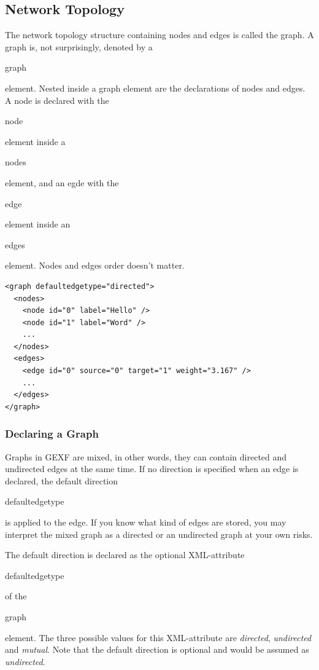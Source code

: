 \documentclass[a4paper,10pt]{article}
\begin{document}
\subsection{Network Topology} \label{networktopology}

The network topology structure containing nodes and edges is called the graph. A graph is, not surprisingly, denoted by a \begin{footnotesize}graph\end{footnotesize} element. Nested inside a graph element are the declarations of nodes and edges. A node is declared with the \begin{footnotesize}node\end{footnotesize} element inside a \begin{footnotesize}nodes\end{footnotesize} element, and an egde with the \begin{footnotesize}edge\end{footnotesize} element inside an \begin{footnotesize}edges\end{footnotesize} element. Nodes and edges order doesn't matter.

\lstset{ style=gexf }
\begin{lstlisting}[caption={The definition of the graph},label=topology]
<graph defaultedgetype="directed">
  <nodes>
    <node id="0" label="Hello" />
    <node id="1" label="Word" />
    ...
  </nodes>
  <edges>
    <edge id="0" source="0" target="1" weight="3.167" />
    ...
  </edges>
</graph>
\end{lstlisting}

\subsubsection{Declaring a Graph}

Graphs in GEXF are mixed, in other words, they can contain directed and undirected edges at the same time. If no direction is specified when an edge is declared, the default direction \begin{footnotesize}defaultedgetype\end{footnotesize} is applied to the edge. If you know what kind of edges are stored, you may interpret the mixed graph as a directed or an undirected graph at your own risks.

The default direction is declared as the optional XML-attribute \begin{footnotesize}defaultedgetype\end{footnotesize} of the \begin{footnotesize}graph\end{footnotesize} element. The three possible values for this XML-attribute are \textit{directed}, \textit{undirected} and \textit{mutual}. Note that the default direction is optional and would be assumed as \textit{undirected}.
\end{document}
